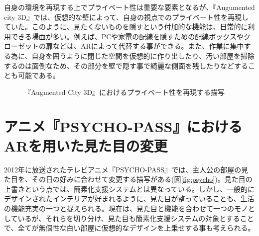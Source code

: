自身の環境を再現する上でプライベート性は重要な要素となるが、『Augumented city 3D』では、仮想的な壁によって、自身の視点でのプライベート性を再現していた。このように、見たくないものを隠すという付加的な機能は、日常的に利用できる場面が多い。例えば、PCや家電の配線を隠すための配線ボックスやクローゼットの扉などは、ARによって代替する事ができる。また、作業に集中する為に、自身を囲うように閉じた空間を仮想的に作り出したり、汚い部屋を掃除するのは面倒なため、その部分を壁で隠す事で綺麗な側面を残したりなどすることも可能である。

\begin{figure}[htbp]
  \begin{minipage}{0.5\hsize}
    \begin{center}
    \end{center}
  \end{minipage}
  \begin{minipage}{0.5\hsize}
    \begin{center}
    \end{center}
  \end{minipage}
  \caption{『Augmented City 3D』におけるプライベート性を再現する描写}
\end{figure}


\section{アニメ『PSYCHO-PASS』におけるARを用いた見た目の変更}

2012年に放送されたテレビアニメ『PSYCHO-PASS』\cite{psycopass}では、主人公の部屋の見た目を、その日の好みに合わせて変更する描写がある(図\ref{fig:psycho})。見た目の上書きという点では、簡素化支援システムとは異なっている。しかし、一般的にデザインされたインテリアが好まれるように、見た目が整っていることも、生活の機能充実の一つと捉えられる。現在は、見た目と機能を合わせて一つのモノとしているが、それらを切り分け、見た目も簡素化支援システムの対象とすることで、全てが無個性な白い部屋に仮想的なデザインを上乗せする事も考えられる。

